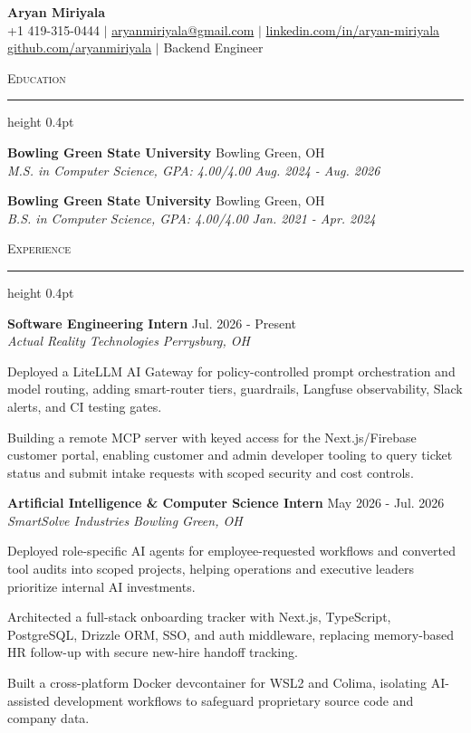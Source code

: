 \documentclass[letterpaper,11pt]{article}
\newcommand{\resumesection}[1]{%
  \par\vspace{2pt}%
  {\large\scshape #1}\par\vspace{2pt}%
  \hrule height 0.4pt\vspace{2pt}%
}
\newcommand{\resumeSubheading}[4]{
  \textbf{#1} \hfill #2\\
  \textit{#3} \hfill \textit{#4}
}
\begin{document}
\begin{center}
  {\LARGE \textbf{Aryan Miriyala}}\\[2pt]
  \small
  +1 419-315-0444 $|$ \href{mailto:aryanmiriyala@gmail.com}{aryanmiriyala@gmail.com} $|$ \href{https://www.linkedin.com/in/aryan-miriyala-7788a21b6/}{linkedin.com/in/aryan-miriyala}\\
  \href{https://github.com/aryanmiriyala}{github.com/aryanmiriyala} $|$ Backend Engineer
\end{center}\vspace{-6pt}

\resumesection{Education}
\resumeSubheading
{Bowling Green State University}{Bowling Green, OH}
{M.S. in Computer Science, GPA: 4.00/4.00}{Aug. 2024 - Aug. 2026}

\resumeSubheading
{Bowling Green State University}{Bowling Green, OH}
{B.S. in Computer Science, GPA: 4.00/4.00}{Jan. 2021 - Apr. 2024}

\resumesection{Experience}
\resumeSubheading
{Software Engineering Intern}{Jul. 2026 - Present}
{Actual Reality Technologies}{Perrysburg, OH}
\begin{tightitemize}
  \item Deployed a LiteLLM AI Gateway for policy-controlled prompt orchestration and model routing, adding smart-router tiers, guardrails, Langfuse observability, Slack alerts, and CI testing gates.
  \item Building a remote MCP server with keyed access for the Next.js/Firebase customer portal, enabling customer and admin developer tooling to query ticket status and submit intake requests with scoped security and cost controls.
\end{tightitemize}

\resumeSubheading
{Artificial Intelligence \& Computer Science Intern}{May 2026 - Jul. 2026}
{SmartSolve Industries}{Bowling Green, OH}
\begin{tightitemize}
  \item Deployed role-specific AI agents for employee-requested workflows and converted tool audits into scoped projects, helping operations and executive leaders prioritize internal AI investments.
  \item Architected a full-stack onboarding tracker with Next.js, TypeScript, PostgreSQL, Drizzle ORM, SSO, and auth middleware, replacing memory-based HR follow-up with secure new-hire handoff tracking.
  \item Built a cross-platform Docker devcontainer for WSL2 and Colima, isolating AI-assisted development workflows to safeguard proprietary source code and company data.
\end{tightitemize}
\end{document}
